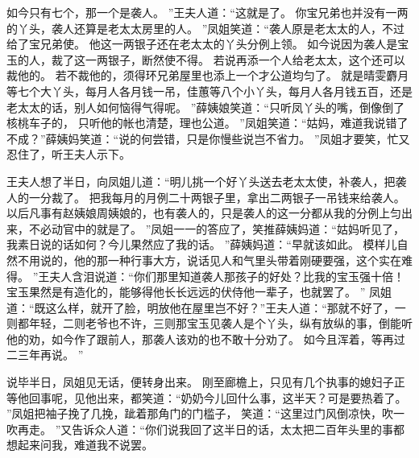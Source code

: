 如今只有七个，那一个是袭人。
”王夫人道：“这就是了。
你宝兄弟也并没有一两的丫头，袭人还算是老太太房里的人。
”凤姐笑道：“袭人原是老太太的人，不过给了宝兄弟使。
他这一两银子还在老太太的丫头分例上领。
如今说因为袭人是宝玉的人，裁了这一两银子，断然使不得。
若说再添一个人给老太太，这个还可以裁他的。
若不裁他的，须得环兄弟屋里也添上一个才公道均匀了。
就是晴雯麝月等七个大丫头，每月人各月钱一吊，佳蕙等八个小丫头，每月人各月钱五百，还是老太太的话，别人如何恼得气得呢。
”薛姨娘笑道：“只听凤丫头的嘴，倒像倒了核桃车子的，
只听他的帐也清楚，理也公道。
”凤姐笑道：“姑妈，难道我说错了不成？”薛姨妈笑道：“说的何尝错，只是你慢些说岂不省力。
”凤姐才要笑，忙又忍住了，听王夫人示下。
\par
王夫人想了半日，向凤姐儿道：“明儿挑一个好丫头送去老太太使，补袭人，把袭人的一分裁了。
把我每月的月例二十两银子里，拿出二两银子一吊钱来给袭人。
以后凡事有赵姨娘周姨娘的，也有袭人的，只是袭人的这一分都从我的分例上匀出来，不必动官中的就是了。
”凤姐一一的答应了，笑推薛姨妈道：“姑妈听见了，我素日说的话如何？今儿果然应了我的话。
”薛姨妈道：“早就该如此。
模样儿自然不用说的，他的那一种行事大方，说话见人和气里头带着刚硬要强，这个实在难得。
”王夫人含泪说道：“你们那里知道袭人那孩子的好处？比我的宝玉强十倍！宝玉果然是有造化的，能够得他长长远远的伏侍他一辈子，也就罢了。
”
凤姐道：“既这么样，就开了脸，明放他在屋里岂不好？”王夫人道：“那就不好了，一则都年轻，二则老爷也不许，三则那宝玉见袭人是个丫头，纵有放纵的事，倒能听他的劝，如今作了跟前人，那袭人该劝的也不敢十分劝了。
如今且浑着，等再过二三年再说。
”\par
说毕半日，凤姐见无话，便转身出来。
刚至廊檐上，只见有几个执事的媳妇子正等他回事呢，见他出来，都笑道：“奶奶今儿回什么事，这半天？可是要热着了。
”凤姐把袖子挽了几挽，跐着那角门的门槛子，
笑道：“这里过门风倒凉快，吹一吹再走。
”又告诉众人道：“你们说我回了这半日的话，太太把二百年头里的事都想起来问我，难道我不说罢。

